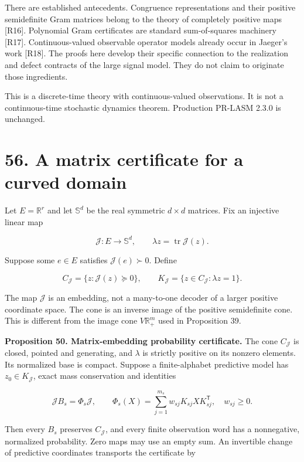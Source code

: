 \documentclass[11pt,letterpaper]{article}
\begin{document}
There are established antecedents. Congruence representations and their
positive semidefinite Gram matrices belong to the theory of completely
positive maps {[}R16{]}. Polynomial Gram certificates are standard
sum-of-squares machinery {[}R17{]}. Continuous-valued observable
operator models already occur in Jaeger's work {[}R18{]}. The proofs
here develop their specific connection to the realization and defect
contracts of the large signal model. They do not claim to originate
those ingredients.

This is a discrete-time theory with continuous-valued observations. It
is not a continuous-time stochastic dynamics theorem. Production PR-LASM
2.3.0 is unchanged.

\section{56. A matrix certificate for a curved
domain}\label{a-matrix-certificate-for-a-curved-domain}

Let \(E=\mathbb R^r\) and let \(\mathbb S^d\) be the real symmetric
\(d\times d\) matrices. Fix an injective linear map

\[
\mathcal J:E\longrightarrow\mathbb S^d,
\qquad \lambda z=\operatorname{tr}\mathcal J(z).
\]

Suppose some \(e\in E\) satisfies \(\mathcal J(e)\succ0\). Define

\[
C_{\mathcal J}=\{z:\mathcal J(z)\succeq0\},
\qquad K_{\mathcal J}=\{z\in C_{\mathcal J}:\lambda z=1\}.
\]

The map \(\mathcal J\) is an embedding, not a many-to-one decoder of a
larger positive coordinate space. The cone is an inverse image of the
positive semidefinite cone. This is different from the image cone
\(V\mathbb R_+^m\) used in Proposition 39.

\textbf{Proposition 50. Matrix-embedding probability certificate.} The
cone \(C_{\mathcal J}\) is closed, pointed and generating, and
\(\lambda\) is strictly positive on its nonzero elements. Its normalized
base is compact. Suppose a finite-alphabet predictive model has
\(z_0\in K_{\mathcal J}\), exact mass conservation and identities

\[
\boxed{\mathcal J B_s=\Phi_s\mathcal J,}
\qquad
\Phi_s(X)=\sum_{j=1}^{m_s} w_{sj}K_{sj}XK_{sj}^{\mathsf T},
\quad w_{sj}\geq0.
\]

Then every \(B_s\) preserves \(C_{\mathcal J}\), and every finite
observation word has a nonnegative, normalized probability. Zero maps
may use an empty sum. An invertible change of predictive coordinates
transports the certificate by
\end{document}
